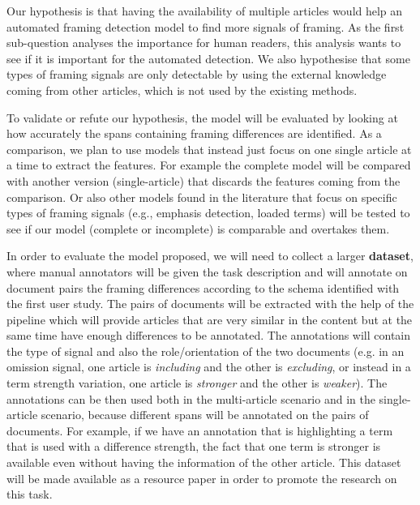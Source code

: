 Our hypothesis is that having the availability of multiple articles would help an automated framing detection model to find more signals of framing.
As the first sub-question analyses the importance for human readers, this analysis wants to see if it is important for the automated detection.
We also hypothesise that some types of framing signals are only detectable by using the external knowledge coming from other articles, which is not used by the existing methods.

To validate or refute our hypothesis, the model will be evaluated by looking at how accurately the spans containing framing differences are identified.
As a comparison, we plan to use models that instead just focus on one single article at a time to extract the features.
For example the complete model will be compared with another version (single-article) that discards the features coming from the comparison.
Or also other models found in the literature that focus on specific types of framing signals (e.g., emphasis detection, loaded terms) will be tested to see if our model (complete or incomplete) is comparable and overtakes them.


In order to evaluate the model proposed, we will need to collect a larger \textbf{dataset}, where manual annotators will be given the task description and will annotate on document pairs the framing differences according to the schema identified with the first user study.
The pairs of documents will be extracted with the help of the pipeline which will provide articles that are very similar in the content but at the same time have enough differences to be annotated. %
The annotations will contain the type of signal and also the role/orientation of the two documents (e.g. in an omission signal, one article is \textit{including} and the other is \textit{excluding}, or instead in a term strength variation, one article is \textit{stronger} and the other is \textit{weaker}).
The annotations can be then used both in the multi-article scenario and in the single-article scenario, because different spans will be annotated on the pairs of documents.
For example, if we have an annotation that is highlighting a term that is used with a difference strength, the fact that one term is stronger is available even without having the information of the other article.
This dataset will be made available as a resource paper in order to promote the research on this task.

